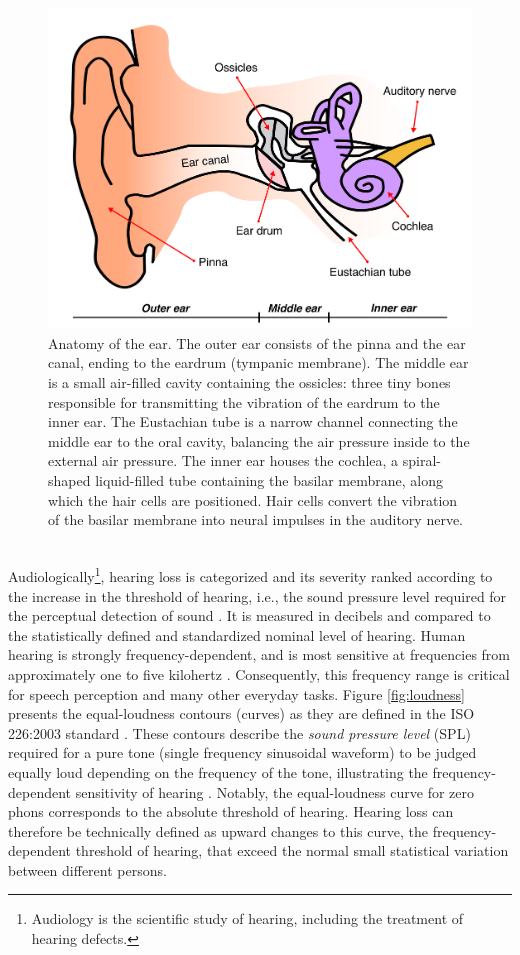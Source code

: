 \documentclass[english, 12pt, a4paper, pdftex, elec, utf8]{aaltothesis}
\begin{document}
\begin{figure}[t]
	\centering 
	\includegraphics[width=\textwidth]{ear.pdf}
	\caption{Anatomy of the ear. The outer ear consists of the pinna and the ear canal, ending to the eardrum (tympanic membrane). The middle ear is a small air-filled cavity containing the ossicles: three tiny bones responsible for transmitting the vibration of the eardrum to the inner ear. The Eustachian tube is a narrow channel connecting the middle ear to the oral cavity, balancing the air pressure inside to the external air pressure. The inner ear houses the cochlea, a spiral-shaped liquid-filled tube containing the basilar membrane, along which the hair cells are positioned. Hair cells convert the vibration of the basilar membrane into neural impulses in the auditory nerve. \cite{moore2007cochlear, pulkki2015communication}}
	\label{fig:ear} 
\end{figure} \\
Audiologically\footnote{Audiology is the scientific study of hearing, including the treatment of hearing defects.}, hearing loss is categorized and its severity ranked according to the increase in the threshold of hearing, i.e., the sound pressure level required for the perceptual detection of sound \cite{moore2007cochlear}. It is measured in decibels and compared to the statistically defined and standardized nominal level of hearing. Human hearing is strongly frequency-dependent, and is most sensitive at frequencies from approximately one to five kilohertz \cite{pulkki2015communication}. Consequently, this frequency range is critical for speech perception and many other everyday tasks. Figure \ref{fig:loudness} presents the equal-loudness contours (curves) as they are defined in the ISO 226:2003 standard \cite{iso226}. These contours describe the \textit{sound pressure level} (SPL) required for a pure tone (single frequency sinusoidal waveform) to be judged equally loud depending on the frequency of the tone, illustrating the frequency-dependent sensitivity of hearing \cite{pulkki2015communication}. Notably, the equal-loudness curve for zero phons corresponds to the absolute threshold of hearing. Hearing loss can therefore be technically defined as upward changes to this curve, the frequency-dependent threshold of hearing, that exceed the normal small statistical variation between different persons. \\
\end{document}
